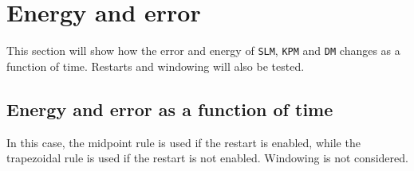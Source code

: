 \section{ Energy and error }%
\label{sec:resultconsterergy}
This section will show how the error and energy of \texttt{SLM}, \texttt{KPM} and \texttt{DM} changes as a function of time. Restarts and windowing will also be tested. 

\subsection{ Energy and error as a function of time } %
In this case, the midpoint rule is used if the restart is enabled, while the trapezoidal rule is used if the restart is not enabled. Windowing is not considered.

